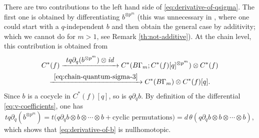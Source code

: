 \documentclass[10pt,a4paper]{amsart}
\newcommand\To[1]{\mathchoice{\xrightarrow{\textstyle\kern4pt#1\kern3pt}}{\stackrel{#1}{\longrightarrow}}{}{}}
\theoremstyle{plain}
\theoremstyle{definition}
\begin{document}
There are two contributions to the left hand side of \eqref{eq:derivative-of-qsigma}. The first one is obtained by differentiating $b^{\otimes p^m}$ (this was unnecessary in \cite{seidel-wilkins21}, where one could start with a $q$-independent $b$ and then obtain the general case by additivity; which we cannot do for $m>1$, see Remark \ref{th:not-additive}). At the chain level, this contribution is obtained from
\begin{multline}\label{eq:derivative-of-b}
C^*(f) \To{t q\partial_q(b^{\otimes p^m}) \otimes \mathit{id}}
C^*(B\Gamma_m;C^*(f)[q]^{\otimes p^m}) \otimes C^*(f)
\\
\To{\eqref{eq:chain-quantum-sigma-3}}
C^*(B\Gamma_m) \otimes C^*(f)[q].
\end{multline}
Since $b$ is a cocycle in $C^*(f)[q]$, so is $q\partial_q b$. By definition of the differential \eqref{eq:v-coefficients}, one has
\begin{equation*}
tq\partial_q(b^{\otimes p^m}) = t\bigl(q\partial_q b \otimes b \otimes \cdots \otimes b +
\text{cyclic permutations}\bigr) = d\, \theta(q\partial_qb \otimes b \otimes \cdots \otimes b),
\end{equation*}
which shows that \eqref{eq:derivative-of-b} is nullhomotopic.
\end{document}
